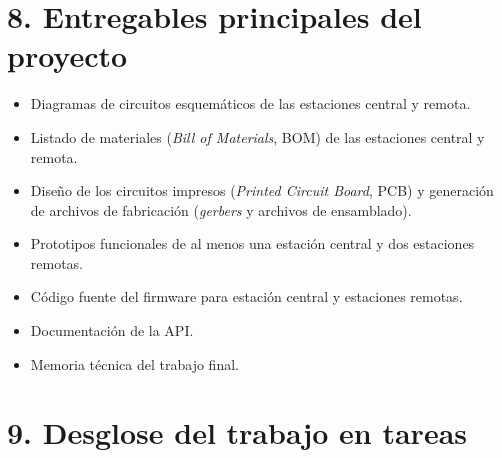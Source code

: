 \documentclass[
11pt, %
]{charter}
\begin{document}
\section{8. Entregables principales del proyecto}
\label{sec:entregables}

\begin{itemize}
	\item Diagramas de circuitos esquemáticos de las estaciones central y remota.
	\item Listado de materiales (\textit{Bill of Materials}, BOM) de las estaciones central y remota.
	\item Diseño de los circuitos impresos (\textit{Printed Circuit Board}, PCB) y generación de archivos de fabricación (\textit{gerbers} y archivos de ensamblado).
	\item Prototipos funcionales de al menos una estación central y dos estaciones remotas.
	\item Código fuente del firmware para estación central y estaciones remotas.
	\item Documentación de la API.
	\item Memoria técnica del trabajo final.
\end{itemize}

\section{9. Desglose del trabajo en tareas}
\label{sec:wbs}
\end{document}
